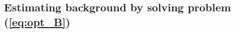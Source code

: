 \documentclass[9pt,lineno]{elife}
\begin{document}

\subsection{Estimating background by solving problem (\ref{eq:opt_B})} \label{sec:solve_pb}

\end{document}

